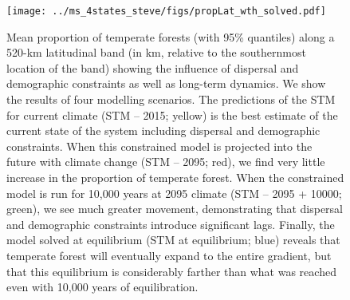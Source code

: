 \begin{figure}[p]
 \centering
\texttt{[image: ../ms\_4states\_steve/figs/propLat\_wth\_solved.pdf]}
\caption[Mean proportion of temperate forests (with 95\% quantiles) along a 520-km latitudinal band (in km,
relative to the southernmost location of the band) showing the influence of dispersal and
demographic constraints as well as long-term dynamics]{
Mean proportion of temperate forests (with 95\% quantiles) along a 520-km latitudinal band (in km,
relative to the southernmost location of the band) showing the influence of dispersal and
demographic constraints as well as long-term dynamics. We show the results of four modelling
scenarios. The predictions of the STM for current climate (STM -- 2015; yellow) is the best estimate
of the current state of the system including dispersal and demographic constraints. When this
constrained model is projected into the future with climate change (STM -- 2095; red), we find very
little increase in the proportion of temperate forest. When the constrained model is run for 10,000
years at 2095 climate (STM -- 2095 + 10000; green), we see much greater movement, demonstrating that
dispersal and demographic constraints introduce significant lags. Finally, the model solved at
equilibrium (STM at equilibrium; blue) reveals that temperate forest will eventually expand to the
entire gradient, but that this equilibrium is considerably farther than what was reached even with
10,000 years of equilibration.}
\label{mig_lat}
\end{figure}

\cleardoublepage

